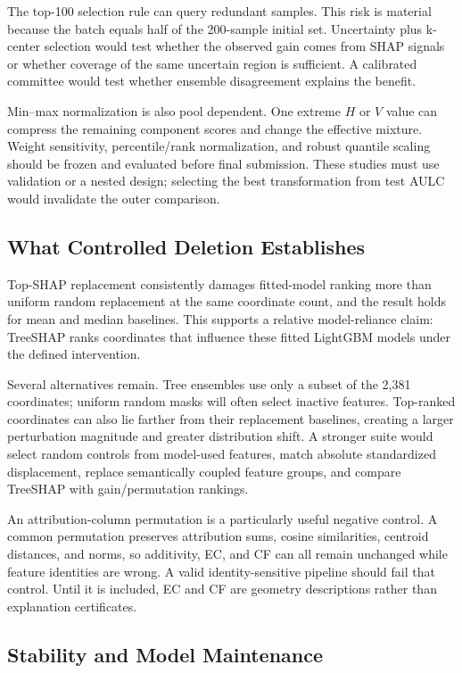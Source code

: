 The top-100 selection rule can query redundant samples. This risk is material
because the batch equals half of the 200-sample initial set. Uncertainty plus
k-center selection would test whether the observed gain comes from SHAP signals
or whether coverage of the same uncertain region is sufficient. A calibrated
committee would test whether ensemble disagreement explains the benefit.

Min--max normalization is also pool dependent. One extreme $H$ or $V$ value can
compress the remaining component scores and change the effective mixture.
Weight sensitivity, percentile/rank normalization, and robust quantile scaling
should be frozen and evaluated before final submission. These studies must use
validation or a nested design; selecting the best transformation from test AULC
would invalidate the outer comparison.

\subsection{What Controlled Deletion Establishes}

Top-SHAP replacement consistently damages fitted-model ranking more than
uniform random replacement at the same coordinate count, and the result holds
for mean and median baselines. This supports a relative model-reliance claim:
TreeSHAP ranks coordinates that influence these fitted LightGBM models under the
defined intervention.

Several alternatives remain. Tree ensembles use only a subset of the 2,381
coordinates; uniform random masks will often select inactive features.
Top-ranked coordinates can also lie farther from their replacement baselines,
creating a larger perturbation magnitude and greater distribution shift. A
stronger suite would select random controls from model-used features, match
absolute standardized displacement, replace semantically coupled feature
groups, and compare TreeSHAP with gain/permutation rankings.

An attribution-column permutation is a particularly useful negative control. A
common permutation preserves attribution sums, cosine similarities, centroid
distances, and norms, so additivity, EC, and CF can all remain unchanged while
feature identities are wrong. A valid identity-sensitive pipeline should fail
that control. Until it is included, EC and CF are geometry descriptions rather
than explanation certificates.

\subsection{Stability and Model Maintenance}

